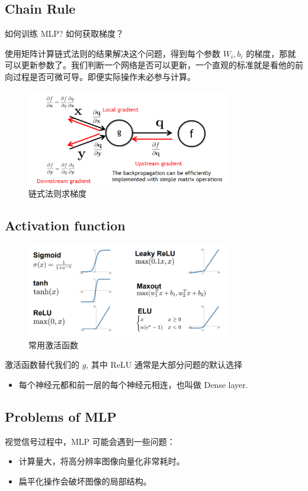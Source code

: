 \subsection{Chain Rule}
\begin{problem}
    如何训练 MLP? 如何获取梯度？
\end{problem}
使用矩阵计算链式法则的结果解决这个问题，得到每个参数 $W_i, b_i$ 的梯度，那就可以更新参数了。我们判断一个网络是否可以更新，一个直观的标准就是看他的前向过程是否可微可导。即便实际操作未必参与计算。
\begin{figure}[htbp]
    \centering
    \includegraphics[width=0.8\textwidth]{figures/chainrule.png}
    \caption{链式法则求梯度}
    \label{fig:chainrule}
\end{figure}

\clearpage

\subsection{Activation function}

\begin{figure}[htbp]
    \centering
    \includegraphics[width=0.8\textwidth]{figures/activationfunc.png}
    \caption{常用激活函数}
    \label{fig:activation-func}
\end{figure}

\begin{note}
激活函数替代我们的 $g$, 其中 ReLU 通常是大部分问题的默认选择
\end{note}

\begin{definition}
    \begin{itemize}
        \item 每个神经元都和前一层的每个神经元相连，也叫做 Dense layer.
    \end{itemize}
\end{definition}

\subsection{Problems of MLP}
视觉信号过程中，MLP 可能会遇到一些问题：
\begin{itemize}
    \item 计算量大，将高分辨率图像向量化非常耗时。
    \item 扁平化操作会破坏图像的局部结构。
\end{itemize}